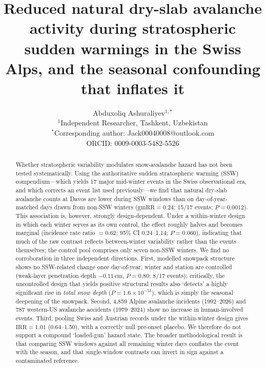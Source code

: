 \documentclass[11pt,letterpaper]{article}
\title{Reduced natural dry-slab avalanche activity during stratospheric sudden warmings in the Swiss Alps, and the seasonal confounding that inflates it}
\author{
    Abduxoliq Ashuraliyev$^{1,*}$
    \\[6pt]
    $^1$Independent Researcher, Tashkent, Uzbekistan\\[6pt]
    $^*$Corresponding author: Jack00040008@outlook.com\\[6pt]
    ORCID: 0009-0003-5482-5526
}
\date{}
\begin{document}
\maketitle
\thispagestyle{empty}

\begin{abstract}
Whether stratospheric variability modulates snow-avalanche hazard has not been tested systematically. Using the authoritative sudden stratospheric warming (SSW) compendium---which yields 17 major mid-winter events in the Swiss observational era, and which corrects an event list used previously---we find that natural dry-slab avalanche counts at Davos are lower during SSW windows than on day-of-year-matched days drawn from non-SSW winters ($\mathrm{gmRR} = 0.24$; 15/17 events; $P = 0.0012$). This association is, however, strongly design-dependent. Under a within-winter design in which each winter serves as its own control, the effect roughly halves and becomes marginal (incidence rate ratio $= 0.62$; 95\% CI 0.24--1.14; $P = 0.060$), indicating that much of the raw contrast reflects between-winter variability rather than the events themselves; the control pool comprises only seven non-SSW winters. We find no corroboration in three independent directions. First, modelled snowpack structure shows no SSW-related change once day-of-year, winter and station are controlled (weak-layer penetration depth $-0.11$\,cm, $P = 0.80$; 8/17 events); critically, the uncontrolled design that yields positive structural results also `detects' a highly significant rise in \emph{total snow depth} ($P = 1.6\times10^{-53}$), which is simply the seasonal deepening of the snowpack. Second, 4{,}859 Alpine avalanche incidents (1992--2026) and 787 western-US avalanche accidents (1979--2024) show no increase in human-involved events. Third, pooling Swiss and Austrian records under the within-winter design gives $\mathrm{IRR} = 1.01$ (0.64--1.50), with a correctly null pre-onset placebo. We therefore do not support a compound `loaded-gun' hazard state. The broader methodological result is that comparing SSW windows against all remaining winter days conflates the event with the season, and that single-window contrasts can invert in sign against a contaminated reference.
\end{abstract}
\end{document}
